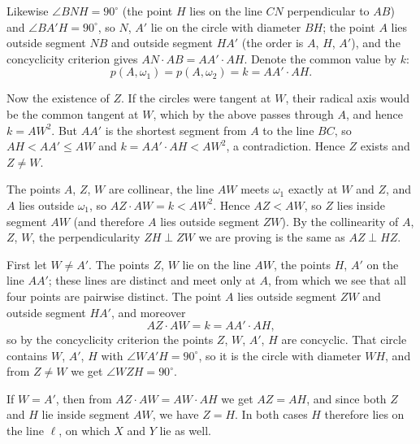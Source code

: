 {    Likewise $\angle BNH = 90^\circ$ (the point $H$ lies on the line $CN$ perpendicular to $AB$) and $\angle BA'H = 90^\circ$, so $N$, $A'$ lie on the circle with diameter $BH$; the point $A$ lies outside segment $NB$ and outside segment $HA'$ (the order is $A$, $H$, $A'$), and the concyclicity criterion gives $AN \cdot AB = AA' \cdot AH$. Denote the common value by $k$:
    $$
    p(A,\omega_1) = p(A,\omega_2) = k = AA' \cdot AH.
    $$

    Now the existence of $Z$. If the circles were tangent at $W$, their radical axis would be the common tangent at $W$, which by the above passes through $A$, and hence $k = AW^2$. But $AA'$ is the shortest segment from $A$ to the line $BC$, so $AH < AA' \leq AW$ and $k = AA' \cdot AH < AW^2$, a contradiction. Hence $Z$ exists and $Z \neq W$.

    The points $A$, $Z$, $W$ are collinear, the line $AW$ meets $\omega_1$ exactly at $W$ and $Z$, and $A$ lies outside $\omega_1$, so $AZ \cdot AW = k < AW^2$. Hence $AZ < AW$, so $Z$ lies inside segment $AW$ (and therefore $A$ lies outside segment $ZW$). By the collinearity of $A$, $Z$, $W$, the perpendicularity $ZH \perp ZW$ we are proving is the same as $AZ \perp HZ$.

    First let $W \neq A'$. The points $Z$, $W$ lie on the line $AW$, the points $H$, $A'$ on the line $AA'$; these lines are distinct and meet only at $A$, from which we see that all four points are pairwise distinct. The point $A$ lies outside segment $ZW$ and outside segment $HA'$, and moreover
    $$
    AZ \cdot AW = k = AA' \cdot AH,
    $$
    so by the concyclicity criterion the points $Z$, $W$, $A'$, $H$ are concyclic. That circle contains $W$, $A'$, $H$ with $\angle WA'H = 90^\circ$, so it is the circle with diameter $WH$, and from $Z \neq W$ we get $\angle WZH = 90^\circ$.

    If $W = A'$, then from $AZ \cdot AW = AW \cdot AH$ we get $AZ = AH$, and since both $Z$ and $H$ lie inside segment $AW$, we have $Z = H$. In both cases $H$ therefore lies on the line $\ell$, on which $X$ and $Y$ lie as well.
}


